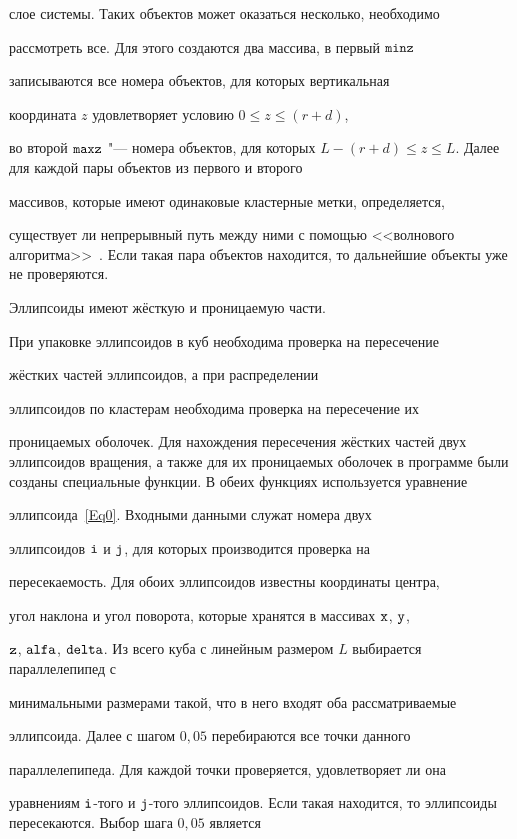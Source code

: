 слое системы. Таких объектов может оказаться несколько, необходимо

рассмотреть все. Для этого создаются два массива, в первый $\tt minz$

записываются все номера объектов, для которых вертикальная

координата $z$ удовлетворяет условию $0\leqslant z\leqslant (r+d)$,

во второй $\tt maxz$ "---  номера объектов, для которых $L-(r+d)\leqslant

z\leqslant L$. Далее для каждой пары объектов из первого и второго

массивов, которые имеют одинаковые кластерные метки, определяется,

существует ли непрерывный путь между ними с помощью <<волнового алгоритма>>~\cite{Rubin}. Если такая пара объектов находится, то дальнейшие объекты уже не проверяются.



Эллипсоиды имеют жёсткую и проницаемую части.

При упаковке эллипсоидов в куб необходима проверка на пересечение

жёстких частей эллипсоидов, а при распределении

эллипсоидов по кластерам необходима проверка на пересечение их

проницаемых оболочек. Для нахождения пересечения жёстких частей двух эллипсоидов вращения, а также для их проницаемых оболочек в программе были созданы специальные функции. В обеих функциях используется уравнение

эллипсоида~\eqref{Eq0}. Входными данными служат номера двух

эллипсоидов $\tt i$ и $\tt j$, для которых производится проверка на

пересекаемость. Для обоих эллипсоидов известны координаты центра,

угол наклона и угол поворота, которые хранятся в массивах $\tt x$, $\tt y$,

$\tt z$, $\tt alfa$, $\tt delta$. Из всего куба с линейным размером $L$ выбирается параллелепипед с

минимальными размерами такой, что в него входят оба рассматриваемые

эллипсоида. Далее с шагом $0,05$ перебираются все точки данного

параллелепипеда. Для каждой точки проверяется, удовлетворяет ли она

уравнениям $\tt i$-того и $\tt j$-того эллипсоидов. Если такая находится, то эллипсоиды пересекаются. Выбор шага $0,05$ является

